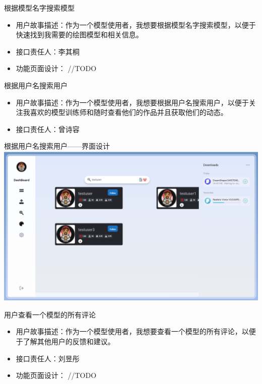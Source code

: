 \begin{frame}{根据模型名字搜索模型}
    \begin{itemize}
        \item 用户故事描述：作为一个模型使用者，我想要根据模型名字搜索模型，以便于快速找到我需要的绘图模型和相关信息。
        \item 接口责任人：李其桐
        \item 功能页面设计： //TODO
    \end{itemize}
\end{frame}

\begin{frame}{根据用户名搜索用户}
    \begin{itemize}
        \item 用户故事描述：作为一个模型使用者，我想要根据用户名搜索用户，以便于关注我喜欢的模型训练师和随时查看他们的作品并且获取他们的动态。
        \item 接口责任人：曾诗容
    \end{itemize}
\end{frame}

\begin{frame}{根据用户名搜索用户——界面设计}
    \includegraphics[width=1\textwidth]{contents/figure/search_user.png}
\end{frame}

\begin{frame}{用户查看一个模型的所有评论}
    \begin{itemize}
        \item 用户故事描述：作为一个模型使用者，我想要查看一个模型的所有评论，以便于了解其他用户的反馈和建议。
        \item 接口责任人：刘昱彤
        \item 功能页面设计： //TODO
    \end{itemize}
\end{frame}

